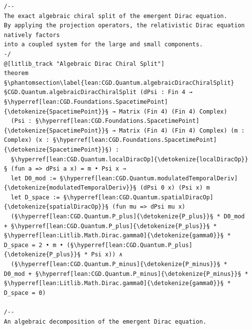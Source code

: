 \begin{verbatim}
/--
The exact algebraic chiral split of the emergent Dirac equation.
By applying the projection operators, the relativistic Dirac equation natively factors
into a coupled system for the large and small components.
-/
@[litlib_track "Algebraic Dirac Chiral Split"]
theorem §\phantomsection\label{lean:CGD.Quantum.algebraicDiracChiralSplit}§CGD.Quantum.algebraicDiracChiralSplit (dPsi : Fin 4 → §\hyperref[lean:CGD.Foundations.SpacetimePoint]{\detokenize{SpacetimePoint}}§ → Matrix (Fin 4) (Fin 4) Complex)
  (Psi : §\hyperref[lean:CGD.Foundations.SpacetimePoint]{\detokenize{SpacetimePoint}}§ → Matrix (Fin 4) (Fin 4) Complex) (m : Complex) (x : §\hyperref[lean:CGD.Foundations.SpacetimePoint]{\detokenize{SpacetimePoint}}§) :
  §\hyperref[lean:CGD.Quantum.localDiracOp]{\detokenize{localDiracOp}}§ (fun a => dPsi a x) = m • Psi x →
  let D0_mod := §\hyperref[lean:CGD.Quantum.modulatedTemporalDeriv]{\detokenize{modulatedTemporalDeriv}}§ (dPsi 0 x) (Psi x) m
  let D_space := §\hyperref[lean:CGD.Quantum.spatialDiracOp]{\detokenize{spatialDiracOp}}§ (fun mu => dPsi mu x)
  (§\hyperref[lean:CGD.Quantum.P_plus]{\detokenize{P_plus}}§ * D0_mod + §\hyperref[lean:CGD.Quantum.P_plus]{\detokenize{P_plus}}§ * §\hyperref[lean:Litlib.Math.Dirac.gamma0]{\detokenize{gamma0}}§ * D_space = 2 • m • (§\hyperref[lean:CGD.Quantum.P_plus]{\detokenize{P_plus}}§ * Psi x)) ∧
  (§\hyperref[lean:CGD.Quantum.P_minus]{\detokenize{P_minus}}§ * D0_mod + §\hyperref[lean:CGD.Quantum.P_minus]{\detokenize{P_minus}}§ * §\hyperref[lean:Litlib.Math.Dirac.gamma0]{\detokenize{gamma0}}§ * D_space = 0)

/--
An algebraic decomposition of the emergent Dirac equation.


\end{verbatim}
